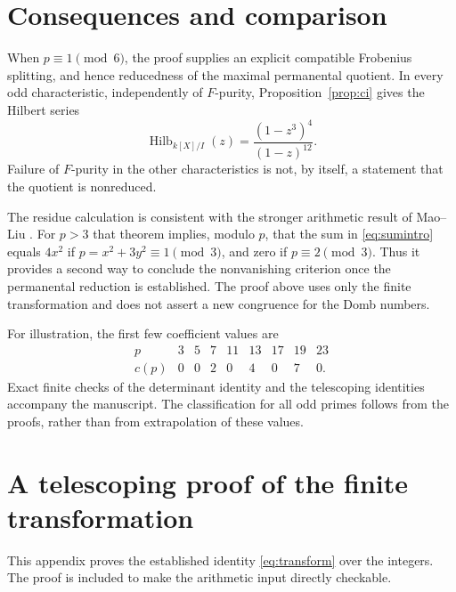 \documentclass[11pt]{article}
\theoremstyle{remark}\newtheorem{remark}[theorem]{Remark}
\numberwithin{equation}{section}
\begin{document}
\section{Consequences and comparison}
When $p\equiv1\pmod6$, the proof supplies an explicit compatible
Frobenius splitting, and hence reducedness of the maximal permanental
quotient. In every odd characteristic, independently of $F$-purity,
Proposition~\ref{prop:ci} gives the Hilbert series
\[
 \operatorname{Hilb}_{k[X]/I}(z)=\frac{(1-z^3)^4}{(1-z)^{12}}.
\]
Failure of $F$-purity in the other characteristics is not, by itself,
a statement that the quotient is nonreduced.

The residue calculation is consistent with the stronger arithmetic
result of Mao--Liu \cite[Theorem~1.1]{ML}. For $p>3$ that theorem
implies, modulo $p$, that the sum in \eqref{eq:sumintro} equals
$4x^2$ if $p=x^2+3y^2\equiv1\pmod3$, and zero if
$p\equiv2\pmod3$. Thus it provides a second way to conclude the
nonvanishing criterion once the permanental reduction is established.
The proof above uses only the finite transformation and does not
assert a new congruence for the Domb numbers.

For illustration, the first few coefficient values are
\[
\begin{array}{c|rrrrrrrr}
p&3&5&7&11&13&17&19&23\\\hline
c(p)&0&0&2&0&4&0&7&0.
\end{array}
\]
Exact finite checks of the determinant identity and the telescoping
identities accompany the manuscript. The classification for all odd
primes follows from the proofs, rather than from extrapolation of
these values.

\appendix
\section{A telescoping proof of the finite transformation}
\label{app:telescoping}
This appendix proves the established identity \eqref{eq:transform}
over the integers. The proof is included to make the arithmetic input
directly checkable.
\end{document}
